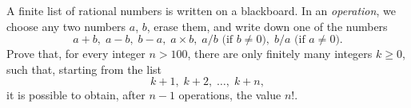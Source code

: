 A finite list of rational numbers is written on a blackboard. In an \emph{operation}, we choose any two numbers $a$, $b$, erase them, and write down one of the numbers \[a + b, \; a - b, \; b - a, \; a \times b, \; a/b \text{ (if $b \neq 0$)}, \; b/a \text{ (if $a \neq 0$)}.\] Prove that, for every integer $n > 100$, there are only finitely many integers $k \ge 0$, such that, starting from the list \[ k + 1, \; k + 2, \; \dots, \; k + n, \] it is possible to obtain, after $n - 1$ operations, the value $n!$.